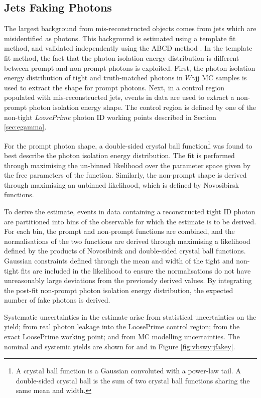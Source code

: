 \subsection{Jets Faking Photons}

The largest background from mis-reconstructed objects comes from jets which are misidentified as photons. This background is estimated using a template fit method, and validated independently using the ABCD method \cite{VBSWy:abcd}. In the template fit method, the fact that the photon isolation energy distribution is different between prompt and non-prompt photons is exploited. First, the photon isolation energy distribution of tight and truth-matched photons in $W\gamma$jj MC samples is used to extract the shape for prompt photons. Next, in a control region populated with mis-reconstructed jets, events in data are used to extract a non-prompt photon isolation energy shape. The control region is defined by one of the non-tight \textit{LoosePrime} photon ID working points described in Section \ref{sec:egamma}. 

For the prompt photon shape, a double-sided crystal ball function\footnote{A crystal ball function \cite{cball1,cball2} is a Gaussian convoluted with a power-law tail. A double-sided crystal ball is the sum of two crystal ball functions sharing the same mean and width.} was found to best describe the photon isolation energy distribution. The fit is performed through maximising the un-binned likelihood over the parameter space given by the free parameters of the function. Similarly, the non-prompt shape is derived through maximising an unbinned likelihood, which is defined by Novosibirsk functions.

To derive the \jfakey estimate, events in data containing a reconstructed tight ID photon are partitioned into bins of the observable for which the estimate is to be derived. For each bin, the prompt and non-prompt functions are combined, and the normalisations of the two functions are derived through maximising a likelihood defined by the products of Novosibirsk and double-sided crystal ball functions. Gaussian constraints defined through the mean and width of the tight and non-tight fits are included in the likelihood to ensure the normalisations do not have unreasonably large deviations from the previously derived values. By integrating the post-fit non-prompt photon isolation energy distribution, the expected number of fake photons is derived.

Systematic uncertainties in the \jfakey estimate arise from statistical uncertainties on the \jfakey yield; from real photon leakage into the LoosePrime control region; from the exact LoosePrime working point; and from MC modelling uncertainties. The nominal and systemic \jfakey yields are shown for \mjj and \ptlep in Figure \ref{fig:vbswy:jfakey}.


